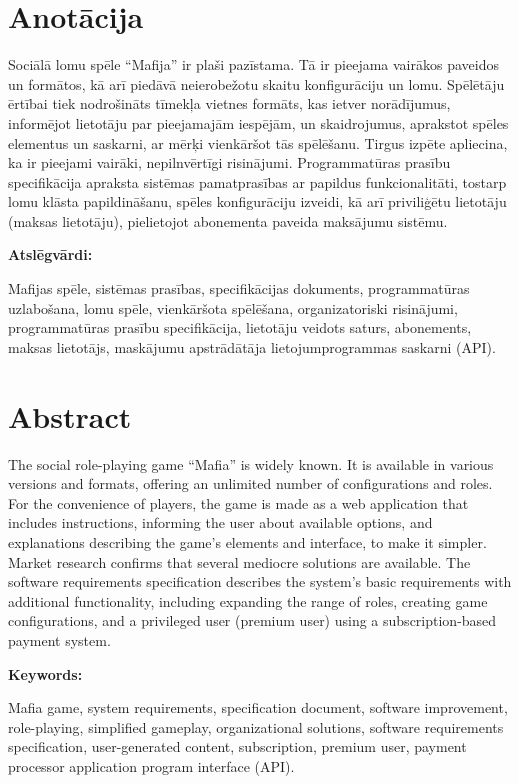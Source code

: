 \section*{Anotācija}
\setcounter{page}{2}
Sociālā lomu spēle ``Mafija'' ir plaši pazīstama. Tā ir pieejama vairākos
paveidos un formātos, kā arī piedāvā neierobežotu skaitu konfigurāciju un lomu.
Spēlētāju ērtībai tiek nodrošināts tīmekļa vietnes formāts, kas ietver
norādījumus, informējot lietotāju par pieejamajām iespējām, un skaidrojumus,
aprakstot spēles elementus un saskarni, ar mērķi vienkāršot tās spēlēšanu.
Tirgus izpēte apliecina, ka ir pieejami vairāki, nepilnvērtīgi risinājumi.
Programmatūras prasību specifikācija apraksta sistēmas pamatprasības ar
papildus funkcionalitāti, tostarp lomu klāsta papildināšanu, spēles
konfigurāciju izveidi, kā arī priviliģētu lietotāju (maksas lietotāju),
pielietojot abonementa paveida maksājumu sistēmu.

\textbf{Atslēgvārdi:}

Mafijas spēle, sistēmas prasības, specifikācijas dokuments, programmatūras
uzlabošana, lomu spēle, vienkāršota spēlēšana, organizatoriski risinājumi,
programmatūras prasību specifikācija, lietotāju veidots saturs, abonements,
maksas lietotājs, maskājumu apstrādātāja lietojumprogrammas saskarni (API).

\section*{Abstract}
The social role-playing game ``Mafia'' is widely known. It is available in
various versions and formats, offering an unlimited number of configurations
and roles. For the convenience of players, the game is made as a web
application that includes instructions, informing the user about available
options, and explanations describing the game's elements and interface, to make
it simpler. Market research confirms that several mediocre solutions are
available. The software requirements specification describes the system's basic
requirements with additional functionality, including expanding the range of
roles, creating game configurations, and a privileged user (premium user) using
a subscription-based payment system.

\textbf{Keywords:}

Mafia game, system requirements, specification document, software improvement,
role-playing, simplified gameplay, organizational solutions, software
requirements specification, user-generated content, subscription, premium user,
payment processor application program interface (API).
